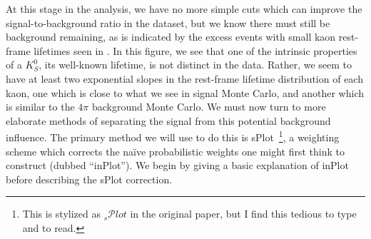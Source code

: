 At this stage in the analysis, we have no more simple cuts which can improve the signal-to-background ratio in the dataset, but we know there must still be background remaining, as is indicated by the excess events with small kaon rest-frame lifetimes seen in . In this figure, we see that one of the intrinsic properties of a $K_S^0$, its well-known lifetime, is not distinct in the data. Rather, we seem to have at least two exponential slopes in the rest-frame lifetime distribution of each kaon, one which is close to what we see in signal Monte Carlo, and another which is similar to the $4\pi$ background Monte Carlo. We must now turn to more elaborate methods of separating the signal from this potential background influence. The primary method we will use to do this is sPlot~\cite{Pivk2005}\footnote{This is stylized as ${}_s\mathcal{P}lot$ in the original paper, but I find this tedious to type and to read.}, a weighting scheme which corrects the na\"ive probabilistic weights one might first think to construct (dubbed ``inPlot''). We begin by giving a basic explanation of inPlot before describing the sPlot correction.


